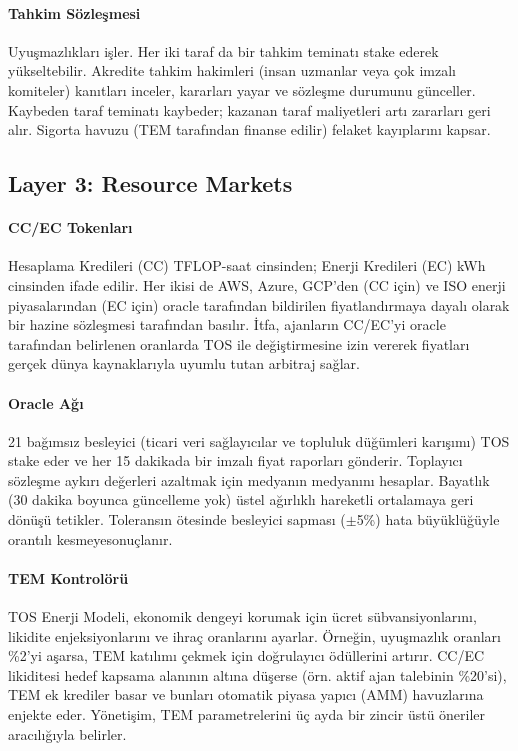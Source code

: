\documentclass[11pt]{article}
\begin{document}
\paragraph{Tahkim Sözleşmesi} Uyuşmazlıkları işler. Her iki taraf da bir tahkim teminatı stake ederek yükseltebilir. Akredite tahkim hakimleri (insan uzmanlar veya çok imzalı komiteler) kanıtları inceler, kararları yayar ve sözleşme durumunu günceller. Kaybeden taraf teminatı kaybeder; kazanan taraf maliyetleri artı zararları geri alır. Sigorta havuzu (TEM tarafından finanse edilir) felaket kayıplarını kapsar.

\subsection{Layer 3: Resource Markets}
\paragraph{CC/EC Tokenları} Hesaplama Kredileri (CC) TFLOP-saat cinsinden; Enerji Kredileri (EC) kWh cinsinden ifade edilir. Her ikisi de AWS, Azure, GCP'den (CC için) ve ISO enerji piyasalarından (EC için) oracle tarafından bildirilen fiyatlandırmaya dayalı olarak bir hazine sözleşmesi tarafından basılır. İtfa, ajanların CC/EC'yi oracle tarafından belirlenen oranlarda TOS ile değiştirmesine izin vererek fiyatları gerçek dünya kaynaklarıyla uyumlu tutan arbitraj sağlar.

\paragraph{Oracle Ağı} 21 bağımsız besleyici (ticari veri sağlayıcılar ve topluluk düğümleri karışımı) TOS stake eder ve her 15 dakikada bir imzalı fiyat raporları gönderir. Toplayıcı sözleşme aykırı değerleri azaltmak için medyanın medyanını hesaplar. Bayatlık (30 dakika boyunca güncelleme yok) üstel ağırlıklı hareketli ortalamaya geri dönüşü tetikler. Toleransın ötesinde besleyici sapması ($\pm$5\%) hata büyüklüğüyle orantılı kesmeyesonuçlanır.

\paragraph{TEM Kontrolörü} TOS Enerji Modeli, ekonomik dengeyi korumak için ücret sübvansiyonlarını, likidite enjeksiyonlarını ve ihraç oranlarını ayarlar. Örneğin, uyuşmazlık oranları \%2'yi aşarsa, TEM katılımı çekmek için doğrulayıcı ödüllerini artırır. CC/EC likiditesi hedef kapsama alanının altına düşerse (örn. aktif ajan talebinin \%20'si), TEM ek krediler basar ve bunları otomatik piyasa yapıcı (AMM) havuzlarına enjekte eder. Yönetişim, TEM parametrelerini üç ayda bir zincir üstü öneriler aracılığıyla belirler.
\end{document}
